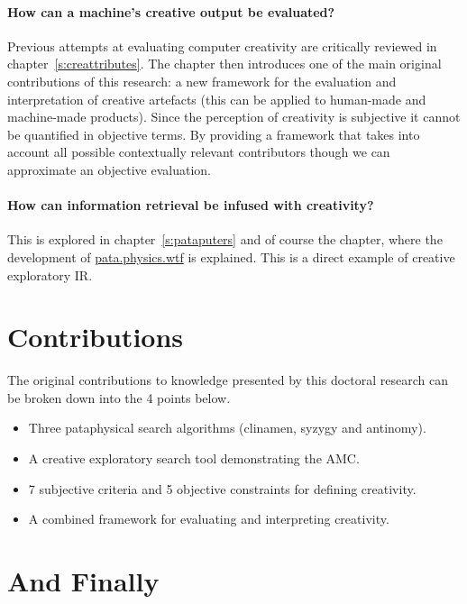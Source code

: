 \paragraph{How can a machine's creative output be evaluated?}

Previous attempts at evaluating computer creativity are critically reviewed in chapter~\ref{s:creattributes}. The  chapter then introduces one of the main original contributions of this research: a new framework for the evaluation and interpretation of creative artefacts (this can be applied to human-made and machine-made products). Since the perception of creativity is subjective it cannot be quantified in objective terms. By providing a framework that takes into account all possible contextually relevant contributors though we can approximate an objective evaluation.

\paragraph{How can information retrieval be infused with creativity?}

This is explored in chapter~\ref{s:pataputers} and of course the  chapter, where the development of \url{pata.physics.wtf} is explained. This is a direct example of creative exploratory \ac{IR}.


\section{Contributions}

The original contributions to knowledge presented by this doctoral research can be broken down into the 4 points below.

\begin{itemize}
  \item Three pataphysical search algorithms (clinamen, syzygy and antinomy).
  \item A creative exploratory search tool demonstrating the \ac{AMC}.
  \item 7 subjective criteria and 5 objective constraints for defining creativity.
  \item A combined framework for evaluating and interpreting creativity.
\end{itemize}


\section{And Finally}

